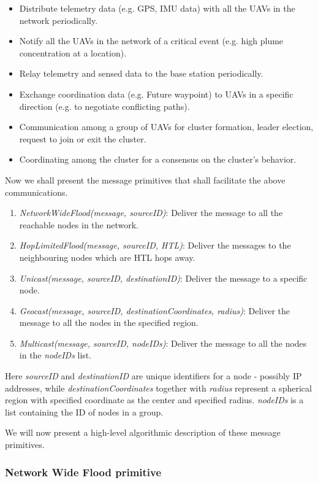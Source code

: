 \begin{itemize}
    \item Distribute telemetry data (e.g. GPS, IMU data) with all the UAVs in the network periodically.
    \item Notify all the UAVs in the network of a critical event (e.g. high plume concentration at a location).
    \item Relay telemetry and sensed data to the base station periodically.
    \item Exchange coordination data (e.g. Future waypoint) to UAVs in a specific direction (e.g. to negotiate conflicting paths).
    \item Communication among a group of UAVs for cluster formation, leader election, request to join or exit the cluster. 
    \item Coordinating among the cluster for a consensus on the cluster's behavior.
\end{itemize}

Now we shall present the message primitives that shall facilitate the above communications. 
\begin{enumerate}
\item \emph{NetworkWideFlood(message, sourceID)}: Deliver  the message to all the reachable nodes in the network.
\item \emph{HopLimitedFlood(message, sourceID, HTL)}: Deliver the messages to the neighbouring nodes which are HTL hops away.
\item \emph{Unicast(message, sourceID, destinationID)}: Deliver the message to a specific node.
\item \emph{Geocast(message, sourceID, destinationCoordinates, radius)}: Deliver the message to all the nodes in the specified region.
\item \emph{Multicast(message, sourceID, nodeIDs)}: Deliver the message to all the nodes in the \emph{nodeIDs} list. 
\end{enumerate}

Here \emph{sourceID} and \emph{destinationID} are unique identifiers for a node - possibly IP addresses, while \emph{destinationCoordinates} together with \emph{radius} represent a spherical region with specified coordinate as the center and specified radius. \emph{nodeIDs} is a list containing the ID of nodes in a group. 

We will now present a high-level algorithmic description of these message primitives.

\subsubsection{Network Wide Flood primitive}

